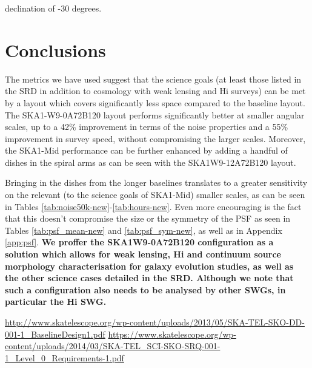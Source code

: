 \documentclass[sfheadings,a4paper,times,9pt,floats,floatfix]{article}
\begin{document}
declination of -30 degrees.









 
\newpage
\section{Conclusions}\label{sec:conclusion}
The metrics we have used suggest that the science goals (at least those listed in the SRD in addition to cosmology with weak
lensing and H{\sc i} surveys) can be met by a layout which covers significantly less space compared to the baseline layout. The
SKA1-W9-0A72B120 layout performs significantly better at smaller angular scales, up to a 42\% improvement in terms of the noise
properties and a 55\% improvement in survey speed, without compromising the larger scales. Moreover, the SKA1-Mid performance can
be further enhanced by adding a handful of dishes in the spiral arms as can be seen
with the SKA1W9-12A72B120 layout.

Bringing in the dishes from the longer baselines translates to a greater sensitivity on the relevant (to the
science goals of SKA1-Mid) smaller scales, as can be seen in Tables \ref{tab:noise50k-new}-\ref{tab:hours-new}. Even
more encouraging is
the fact that this doesn't compromise the size or the symmetry of the PSF as seen in Tables \ref{tab:psf_mean-new} and
\ref{tab:psf_sym-new}, as well as in Appendix \ref{app:psf}. {\bf We proffer the SKA1W9-0A72B120 configuration as a solution
which allows for weak lensing, H{\sc i}
and continuum source morphology characterisation for galaxy evolution studies, as well as the other science cases detailed in the
SRD. Although we note that such a configuration also needs to be analysed by other SWGs, in particular the H{\sc i} SWG.}

\begin{thebibliography}{99}
  \url{http://www.skatelescope.org/wp-content/uploads/2013/05/SKA-TEL-SKO-DD-001-1_BaselineDesign1.pdf}
  \url{https://www.skatelescope.org/wp-content/uploads/2014/03/SKA-TEL_SCI-SKO-SRQ-001-1_Level_0_Requirements-1.pdf}
\end{thebibliography}
\pagebreak
\appendix
\end{document}
